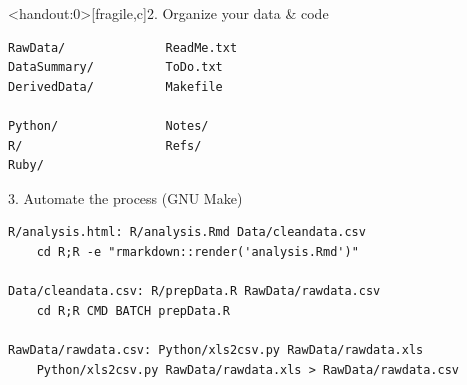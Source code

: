 \documentclass[12pt,t]{beamer}
\begin{document}
\begin{frame}<handout:0>[fragile,c]{2. Organize your data \& code}


\begin{center}
\begin{minipage}[c]{10.3cm}
\begin{semiverbatim}
\lstset{basicstyle=\normalsize}
\begin{lstlisting}[linewidth=10.3cm]
RawData/              ReadMe.txt
DataSummary/          ToDo.txt
DerivedData/          Makefile

Python/               Notes/
R/                    Refs/
Ruby/
\end{lstlisting}
\end{semiverbatim}
\end{minipage}
\end{center}

\end{frame}


\begin{frame}[fragile,c]{3. Automate the process (GNU Make)}

\begin{semiverbatim}
\begin{lstlisting}
R/analysis.html: R/analysis.Rmd Data/cleandata.csv
    cd R;R -e "rmarkdown::render('analysis.Rmd')"

Data/cleandata.csv: R/prepData.R RawData/rawdata.csv
    cd R;R CMD BATCH prepData.R

RawData/rawdata.csv: Python/xls2csv.py RawData/rawdata.xls
    Python/xls2csv.py RawData/rawdata.xls > RawData/rawdata.csv
\end{lstlisting}
\end{semiverbatim}

\end{frame}
\end{document}
